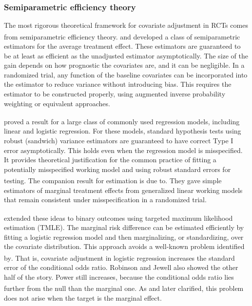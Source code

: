 \documentclass[
  11pt,
]{article}
\begin{document}
\subsubsection{Semiparametric efficiency theory}\label{semiparametric-efficiency-theory}

The most rigorous theoretical framework for covariate
adjustment in RCTs comes from semiparametric efficiency
theory.\textsuperscript{} and\textsuperscript{}
developed a class of semiparametric estimators for the
average treatment effect. These estimators are
guaranteed to be at least as efficient as the
unadjusted estimator asymptotically. The size of the
gain depends on how prognostic the covariates are, and
it can be negligible. In a
randomized trial, any function of the baseline
covariates can be incorporated into the estimator to
reduce variance without introducing bias. This requires the estimator
to be constructed properly, using augmented inverse
probability weighting or equivalent approaches.

\textsuperscript{} proved a result for a large
class of commonly used regression models, including
linear and logistic regression. For these models,
standard hypothesis tests using robust (sandwich)
variance estimators are guaranteed to have correct Type
I error asymptotically. This holds even when the
regression model is misspecified. It provides
theoretical justification for the common practice of
fitting a potentially misspecified working model and
using robust standard errors for testing. The companion
result for estimation is due to\textsuperscript{}. They gave simple estimators of
marginal treatment effects from generalized linear
working models that remain consistent under
misspecification in a randomized trial.

\textsuperscript{} extended these ideas to binary
outcomes using targeted maximum likelihood estimation
(TMLE). The marginal risk difference can be estimated
efficiently by fitting a logistic regression model and
then marginalizing, or standardizing, over the
covariate distribution. This approach avoids a
well-known problem identified by\textsuperscript{}.
That is, covariate adjustment in logistic regression
increases the standard error of the conditional odds
ratio. Robinson and Jewell also showed the other half
of the story. Power still increases, because the
conditional odds ratio lies further from the null than
the marginal one. As\textsuperscript{} and\textsuperscript{} later
clarified, this problem does not arise when the target
is the marginal effect.
\end{document}
